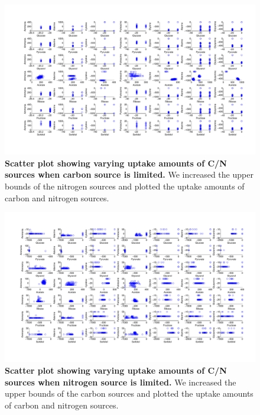 \documentclass[12pt]{article}
\begin{document}
\renewcommand{\figurename}{Supplementary Figure}

\clearpage
\begin{figure}[!ht]
\centerline{\includegraphics[width=9in]{Figures/SuppInfo/CarbonLimiting.pdf}}
\caption{\label{fig:CarbonLimiting}\textbf{Scatter plot showing varying uptake amounts of C/N sources when carbon source is limited.} We  increased the upper bounds of the nitrogen sources and plotted the uptake amounts of carbon and nitrogen sources.}
\end{figure}

\clearpage
\begin{figure}[!ht]
\centerline{\includegraphics[width=9in]{Figures/SuppInfo/NitrogenLimiting.pdf}}
\caption{\label{fig:NitrogenLimiting}\textbf{Scatter plot showing varying uptake amounts of C/N sources when nitrogen source is limited. }We  increased the upper bounds of the carbon sources and plotted the uptake amounts of carbon and nitrogen sources.}
\end{figure}
\end{document}
